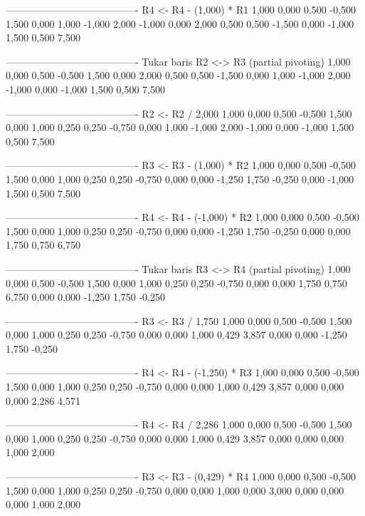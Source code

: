 \documentclass[12pt]{article}
\begin{document}
\begin{enumerate}
\begin{keluaran}
----------------------------------------
R4 <- R4 - (1,000) * R1
1,000   0,000   0,500   -0,500  1,500
0,000   1,000   -1,000  2,000   -1,000
0,000   2,000   0,500   0,500   -1,500
0,000   -1,000  1,500   0,500   7,500

----------------------------------------
Tukar baris R2 <-> R3 (partial pivoting)
1,000   0,000   0,500   -0,500  1,500
0,000   2,000   0,500   0,500   -1,500
0,000   1,000   -1,000  2,000   -1,000
0,000   -1,000  1,500   0,500   7,500

----------------------------------------
R2 <- R2 / 2,000
1,000   0,000   0,500   -0,500  1,500
0,000   1,000   0,250   0,250   -0,750
0,000   1,000   -1,000  2,000   -1,000
0,000   -1,000  1,500   0,500   7,500

----------------------------------------
R3 <- R3 - (1,000) * R2
1,000   0,000   0,500   -0,500  1,500
0,000   1,000   0,250   0,250   -0,750
0,000   0,000   -1,250  1,750   -0,250
0,000   -1,000  1,500   0,500   7,500

----------------------------------------
R4 <- R4 - (-1,000) * R2
1,000   0,000   0,500   -0,500  1,500
0,000   1,000   0,250   0,250   -0,750
0,000   0,000   -1,250  1,750   -0,250
0,000   0,000   1,750   0,750   6,750

----------------------------------------
Tukar baris R3 <-> R4 (partial pivoting)
1,000   0,000   0,500   -0,500  1,500
0,000   1,000   0,250   0,250   -0,750
0,000   0,000   1,750   0,750   6,750
0,000   0,000   -1,250  1,750   -0,250

----------------------------------------
R3 <- R3 / 1,750
1,000   0,000   0,500   -0,500  1,500
0,000   1,000   0,250   0,250   -0,750
0,000   0,000   1,000   0,429   3,857
0,000   0,000   -1,250  1,750   -0,250

----------------------------------------
R4 <- R4 - (-1,250) * R3
1,000   0,000   0,500   -0,500  1,500
0,000   1,000   0,250   0,250   -0,750
0,000   0,000   1,000   0,429   3,857
0,000   0,000   0,000   2,286   4,571

----------------------------------------
R4 <- R4 / 2,286
1,000   0,000   0,500   -0,500  1,500
0,000   1,000   0,250   0,250   -0,750
0,000   0,000   1,000   0,429   3,857
0,000   0,000   0,000   1,000   2,000

----------------------------------------
R3 <- R3 - (0,429) * R4
1,000   0,000   0,500   -0,500  1,500
0,000   1,000   0,250   0,250   -0,750
0,000   0,000   1,000   0,000   3,000
0,000   0,000   0,000   1,000   2,000


\end{keluaran}
\end{enumerate}
\end{document}
